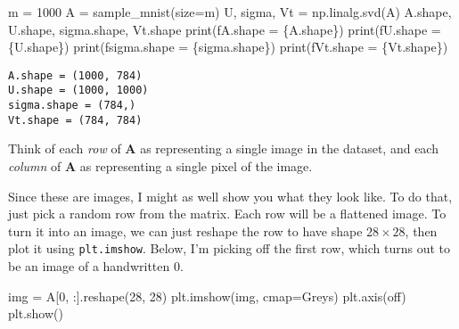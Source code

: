 \documentclass[
  letterpaper,
  DIV=11,
  numbers=noendperiod]{scrreprt}
\newenvironment{Shaded}{\begin{snugshade}}{\end{snugshade}}
\newcommand{\BuiltInTok}[1]{\textcolor[rgb]{0.00,0.23,0.31}{#1}}
\newcommand{\DecValTok}[1]{\textcolor[rgb]{0.68,0.00,0.00}{#1}}
\newcommand{\NormalTok}[1]{\textcolor[rgb]{0.00,0.23,0.31}{#1}}
\newcommand{\OperatorTok}[1]{\textcolor[rgb]{0.37,0.37,0.37}{#1}}
\newcommand{\SpecialCharTok}[1]{\textcolor[rgb]{0.37,0.37,0.37}{#1}}
\newcommand{\SpecialStringTok}[1]{\textcolor[rgb]{0.13,0.47,0.30}{#1}}
\newcommand{\StringTok}[1]{\textcolor[rgb]{0.13,0.47,0.30}{#1}}
\begin{document}
\begin{Shaded}
\begin{Highlighting}[]
\NormalTok{m }\OperatorTok{=} \DecValTok{1000}
\NormalTok{A }\OperatorTok{=}\NormalTok{ sample\_mnist(size}\OperatorTok{=}\NormalTok{m)}
\NormalTok{U, sigma, Vt }\OperatorTok{=}\NormalTok{ np.linalg.svd(A)}
\NormalTok{A.shape, U.shape, sigma.shape, Vt.shape}
\BuiltInTok{print}\NormalTok{(}\SpecialStringTok{f\textquotesingle{}A.shape = }\SpecialCharTok{\{}\NormalTok{A}\SpecialCharTok{.}\NormalTok{shape}\SpecialCharTok{\}}\SpecialStringTok{\textquotesingle{}}\NormalTok{)}
\BuiltInTok{print}\NormalTok{(}\SpecialStringTok{f\textquotesingle{}U.shape = }\SpecialCharTok{\{}\NormalTok{U}\SpecialCharTok{.}\NormalTok{shape}\SpecialCharTok{\}}\SpecialStringTok{\textquotesingle{}}\NormalTok{)}
\BuiltInTok{print}\NormalTok{(}\SpecialStringTok{f\textquotesingle{}sigma.shape = }\SpecialCharTok{\{}\NormalTok{sigma}\SpecialCharTok{.}\NormalTok{shape}\SpecialCharTok{\}}\SpecialStringTok{\textquotesingle{}}\NormalTok{)}
\BuiltInTok{print}\NormalTok{(}\SpecialStringTok{f\textquotesingle{}Vt.shape = }\SpecialCharTok{\{}\NormalTok{Vt}\SpecialCharTok{.}\NormalTok{shape}\SpecialCharTok{\}}\SpecialStringTok{\textquotesingle{}}\NormalTok{)}
\end{Highlighting}
\end{Shaded}

\begin{verbatim}
A.shape = (1000, 784)
U.shape = (1000, 1000)
sigma.shape = (784,)
Vt.shape = (784, 784)
\end{verbatim}

Think of each \emph{row} of \(\mathbf{A}\) as representing a single
image in the dataset, and each \emph{column} of \(\mathbf{A}\) as
representing a single pixel of the image.

Since these are images, I might as well show you what they look like. To
do that, just pick a random row from the matrix. Each row will be a
flattened image. To turn it into an image, we can just reshape the row
to have shape \(28 \times 28\), then plot it using \texttt{plt.imshow}.
Below, I'm picking off the first row, which turns out to be an image of
a handwritten \(0\).

\begin{Shaded}
\begin{Highlighting}[]
\NormalTok{img }\OperatorTok{=}\NormalTok{ A[}\DecValTok{0}\NormalTok{, :].reshape(}\DecValTok{28}\NormalTok{, }\DecValTok{28}\NormalTok{)}
\NormalTok{plt.imshow(img, cmap}\OperatorTok{=}\StringTok{\textquotesingle{}Greys\textquotesingle{}}\NormalTok{)}
\NormalTok{plt.axis(}\StringTok{\textquotesingle{}off\textquotesingle{}}\NormalTok{)}
\NormalTok{plt.show()}
\end{Highlighting}
\end{Shaded}
\end{document}
